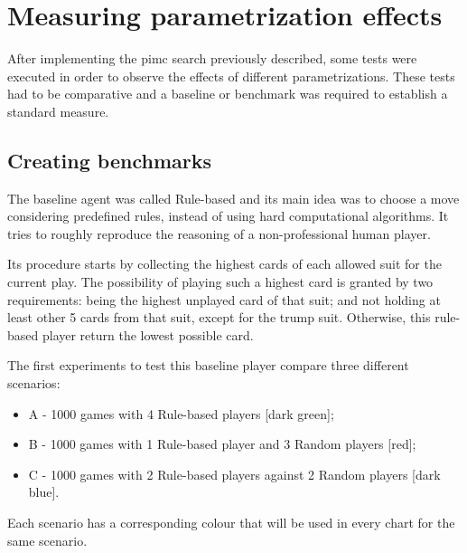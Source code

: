 \section{Measuring parametrization effects}
\label{sec:parametrizing}

After implementing the \ac{pimc} search previously described, some tests were executed in order to observe the effects of different parametrizations.
These tests had to be comparative and a baseline or benchmark was required to establish a standard measure.


\subsection{Creating benchmarks}
The baseline agent was called Rule-based and its main idea was to choose a move considering predefined rules, instead of using hard computational algorithms.
It tries to roughly reproduce the reasoning of a non-professional human player.

Its procedure starts by collecting the highest cards of each allowed suit for the current play.
The possibility of playing such a highest card is granted by two requirements: being the highest unplayed card of that suit; and not holding at least other 5 cards from that suit, except for the trump suit.
Otherwise, this rule-based player return the lowest possible card.

The first experiments to test this baseline player compare three different scenarios:
\begin{itemize}
\item A - 1000 games with 4 Rule-based players [dark green];
\item B - 1000 games with 1 Rule-based player and 3 Random players [red];
\item C - 1000 games with 2 Rule-based players against 2 Random players [dark blue].
\end{itemize}
Each scenario has a corresponding colour that will be used in every chart for the same scenario.

